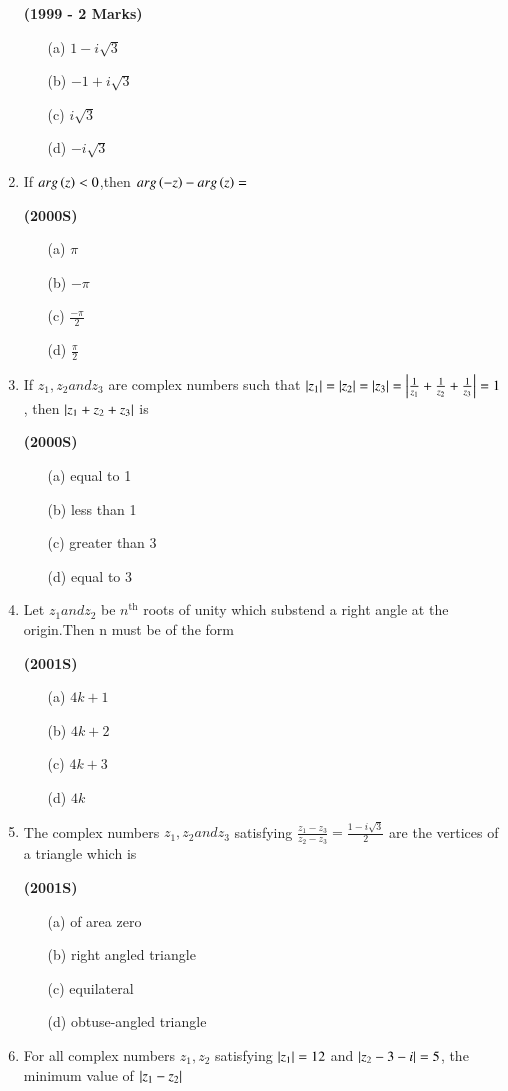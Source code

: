 \documentclass[journal,12pt,twocolumn]{IEEEtran}
\theoremstyle{remark}
\begin{document}
\begin{enumerate}[start=6]
\hfill{\textbf{(1999 - 2 Marks)}}

\begin{enumerate}
\item[(a)]$1-i\sqrt{3}$
\item[(b)]$-1+i\sqrt{3}$
\item[(c)]$i\sqrt{3}$
\item[(d)]$-i\sqrt{3}$
\end{enumerate}
\item If $arg\left(z\right)<0$,then $arg\left(-z\right)-arg\left(z\right)=$

\hfill{\textbf{(2000S)}}

\begin{enumerate}
\item[(a)]$\pi$
\item[(b)]$-\pi$
\item[(c)]$\frac{-\pi}{2}$
\item[(d)]$\frac{\pi}{2}$
\end{enumerate}
\item If $z_1,z_2 and z_3$ are complex numbers such that $\left\vert z_1\right\vert=\left\vert z_2\right\vert=\left\vert z_3\right\vert=\left\vert\frac{1}{z_1}+\frac{1}{z_2}+\frac{1}{z_3}\right\vert=1$, then $\left\vert z_1+z_2+z_3\right\vert$ is 

\hfill{\textbf{(2000S)}}

\begin{enumerate}
\item[(a)]equal to 1
\item[(b)]less than 1
\item[(c)]greater than 3
\item[(d)]equal to 3
\end{enumerate}
\item Let $z_1 and z_2$ be $n^{\text{th}}$ roots of unity which substend a right angle at the origin.Then n must be of the form

\hfill{\textbf{(2001S)}}

\begin{enumerate}
\item[(a)]$4k+1$
\item[(b)]$4k+2$
\item[(c)]$4k+3$
\item[(d)]$4k$
\end{enumerate}
\item The complex numbers $z_1,z_2 and z_3$ satisfying $\frac{z_1-z_3}{z_2-z_3}=\frac{1-i\sqrt{3}}{2}$ are the vertices of a triangle which is

\hfill{\textbf{(2001S)}}

\begin{enumerate}
\item[(a)]of area zero
\item[(b)]right angled triangle
\item[(c)]equilateral
\item[(d)]obtuse-angled triangle
\end{enumerate}
\item For all complex numbers $z_1,z_2$ satisfying $\left\vert z_1\right\vert=12$ and $\left\vert z_2-3-i\right\vert=5$, the minimum value of $\left\vert z_1-z_2\right\vert$


\end{enumerate}
\end{document}
